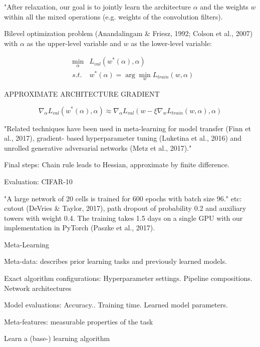 \documentclass[english]{article}
\begin{document}
\item "After relaxation, our goal is to jointly learn the architecture $\alpha$ and the weights $w$ within all the mixed
operations (e.g. weights of the convolution filters).

\item Bilevel optimization problem (Anandalingam \& Friesz, 1992; Colson et al., 2007) with $\alpha$ as the upper-level variable and $w$ as the lower-level variable:

\begin{align*}
&\min_\alpha &L_{val}(w^*(\alpha),\alpha)\\
&s.t. & w^*(\alpha) = \arg\min_w L_{train} (w,\alpha)
\end{align*} 

\item APPROXIMATE ARCHITECTURE GRADIENT

$$\nabla_\alpha L_{val}(w^*(\alpha),\alpha)
\approx
\nabla_\alpha L_{val}(w-\xi \nabla_w L_{train}(w,\alpha),\alpha)
$$

"Related techniques have been used in meta-learning for model transfer (Finn et al., 2017), gradient-
based hyperparameter tuning (Luketina et al., 2016) and unrolled generative adversarial networks
(Metz et al., 2017)."

Final steps: Chain rule leads to Hessian, approximate by finite difference. 

\item Evaluation: CIFAR-10 

"A large network of 20 cells is trained for 600 epochs with batch size 96." etc: cutout (DeVries \& Taylor, 2017), path dropout of
probability 0.2 and auxiliary towers with weight 0.4. The training takes 1.5 days on a single GPU
with our implementation in PyTorch (Paszke et al., 2017).

\eenum

\item Meta-Learning

\benum 
\item Meta-data: describes prior learning tasks and previously learned models.

Exact algorithm configurations: Hyperparameter settings. Pipeline compositions. Network architectures


Model evaluations: Accuracy.. Training time.  Learned model parameters.

Meta-features: measurable properties of the task 

\item Learn a (base-) learning algorithm
\end{document}
